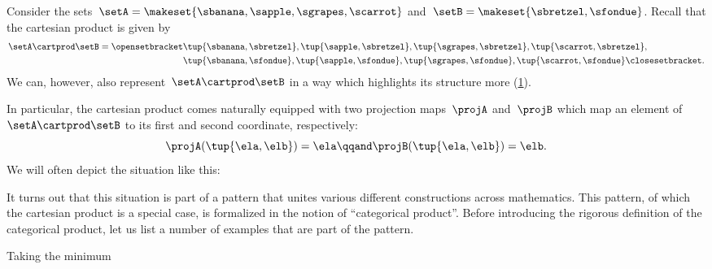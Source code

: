 \begin{example}
    Consider the sets~$\setA = \makeset{\sbanana, \sapple, \sgrapes, \scarrot}$ and~$\setB = \makeset{ \sbretzel, \sfondue }$.
    Recall that the cartesian product is given by
    \begin{equation}
        \label{eq:cart-prod-example}
        \begin{aligned}
            \setA \cartprod \setB = \opensetbracket & \tup{\sbanana, \sbretzel}, \tup{\sapple, \sbretzel}, \tup{\sgrapes, \sbretzel}, \tup{\scarrot, \sbretzel}, \\
                                                    & \tup{\sbanana,\sfondue}, \tup{\sapple, \sfondue}, \tup{\sgrapes, \sfondue}, \tup{\scarrot, \sfondue} \closesetbracket.
        \end{aligned}
    \end{equation}
    We can, however, also represent~$\setA \cartprod \setB$ in a way which highlights its structure more (\cref{fig:example_cartesian}).
    \begin{figure}[h!]
        \centering
        \caption{}
        \label{fig:example_cartesian}
    \end{figure}

    In particular, the cartesian product comes naturally equipped with two projection maps~$\projA$ and~$\projB$ which map an element of~$\setA \cartprod \setB$ to its first and second coordinate, respectively:
    \begin{equation}
        \projA(\tup{\ela,\elb}) =  \ela  \qqand \projB(\tup{\ela,\elb}) = \elb.
    \end{equation}
    We will often depict the situation like this:
\end{example}

It turns out that this situation is part of a pattern that unites various different constructions across mathematics.
This pattern, of which the cartesian product is a special case, is formalized in the notion of ``categorical product''.
Before introducing the rigorous definition of the categorical product, let us list a number of examples that are part of the pattern.

\begin{marginfigure}
    \centering
    \caption{Taking the minimum}
    \label{fig:exa_prod_min}
\end{marginfigure}

